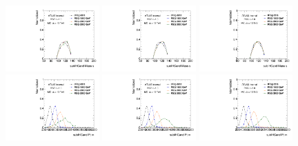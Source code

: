 \begin{figure}[htbp!]
\begin{center}
\includegraphics[angle=270, width=0.32\textwidth]{./figures/boosted/Truth/Moriond_comp_0_FourTag_Signal_sublHCand_Mass_s.pdf}
\includegraphics[angle=270, width=0.32\textwidth]{./figures/boosted/Truth/Moriond_comp_0_ThreeTag_Signal_sublHCand_Mass_s.pdf}
\includegraphics[angle=270, width=0.32\textwidth]{./figures/boosted/Truth/Moriond_comp_0_TwoTag_split_Signal_sublHCand_Mass_s.pdf}\\
\includegraphics[angle=270, width=0.32\textwidth]{./figures/boosted/Truth/Moriond_comp_0_FourTag_Signal_sublHCand_Pt_m.pdf}
\includegraphics[angle=270, width=0.32\textwidth]{./figures/boosted/Truth/Moriond_comp_0_ThreeTag_Signal_sublHCand_Pt_m.pdf}
\includegraphics[angle=270, width=0.32\textwidth]{./figures/boosted/Truth/Moriond_comp_0_TwoTag_split_Signal_sublHCand_Pt_m.pdf}\\

\end{center}
\end{figure}
